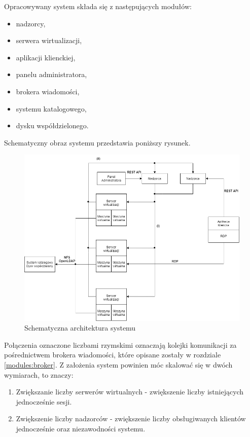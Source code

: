 \documentclass[../opis-rozwiazania.tex]{subfiles}
\begin{document}
Opracowywany system składa się z następujących modułów:

\begin{itemize}
    \item nadzorcy,
    \item serwera wirtualizacji,
    \item aplikacji klienckiej,
    \item panelu administratora,
    \item brokera wiadomości,
    \item systemu katalogowego,
    \item dysku współdzielonego.
\end{itemize}

Schematyczny obraz systemu przedstawia poniższy rysunek.

\begin{figure}[H]
    \centering
    \includegraphics[width=\textwidth]{../diagrams/architecture.png}
    \caption{Schematyczna architektura systemu}
\end{figure}

Połączenia oznaczone liczbami rzymskimi oznaczają kolejki komunikacji za pośrednictwem brokera wiadomości, które opisane zostały w rozdziale \ref{modules:broker}. Z założenia system powinien móc skalować się w dwóch wymiarach, to znaczy:
\begin{enumerate}
    \item Zwiększanie liczby serwerów wirtualnych - zwiększenie liczby istniejących jednocześnie sesji.
    \item Zwiększenie liczby nadzorców - zwiększenie liczby obsługiwanych klientów jednocześnie oraz niezawodności systemu.
\end{enumerate}
\end{document}
